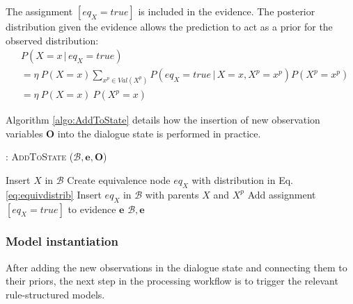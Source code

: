 The assignment $[\mathit{eq}_{X} \!=\! true]$ is included in the evidence. The posterior distribution given the evidence allows the prediction to act as a prior for the observed distribution:
\begin{align}
&P(X = x \, | \, \mathit{eq}_{X}\!=\!true) \nonumber \\
&=  \eta \ P(X\!=\!x)  \sum_{x^p \in \mathit{Val}(X^p)} P(\mathit{eq}_{X}\!=\!true\, |\, X\!=\!x, X^p \!=\!x^p ) P(X^p\!=\!x^p)  \nonumber\\
&= \eta \ P(X\!=\!x) \ P(X^p\!=\!x)  \nonumber 
\end{align}


Algorithm \ref{algo:AddToState} details how the insertion of new observation variables $\mathbf{O}$ into the dialogue state is performed in practice. 

\begin{algorithm}[ht]
\caption{: \textsc{AddToState} ($\mathcal{B}, \mathbf{e}, \mathbf{O}$)}
\begin{algorithmic}[1] \vspace{1mm}
\STATE Insert $X$ in $\mathcal{B}$ 
\ENDIF
{}
\STATE Create equivalence node $\mathit{eq}_{X}$ with distribution in Eq. \eqref{eq:equivdistrib}
\STATE Insert $\mathit{eq}_{X}$ in $\mathcal{B}$ with parents $\mathit{X}$ and $\mathit{X}^p$
\STATE Add assignment $[\mathit{eq}_{X}\!=\!true]$ to evidence $\mathbf{e}$
\ENDIF
\ENDFOR
\RETURN $\mathcal{B}, \mathbf{e}$
\end{algorithmic}
\label{algo:AddToState}
\end{algorithm}



\subsubsection*{Model instantiation}

After adding the new observations in the dialogue state and connecting them to their priors, the next step in the processing workflow is to trigger the relevant rule-structured models. 

